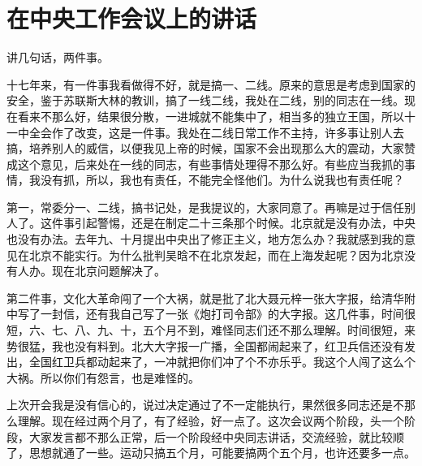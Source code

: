 \section[在中央工作会议上的讲话（一九六六年十月二十五日）]{在中央工作会议上的讲话}


讲几句话，两件事。

十七年来，有一件事我看做得不好，就是搞一、二线。原来的意思是考虑到国家的安全，鉴于苏联斯大林的教训，搞了一线二线，我处在二线，别的同志在一线。现在看来不那么好，结果很分散，一进城就不能集中了，相当多的独立王国，所以十一中全会作了改变，这是一件事。我处在二线日常工作不主持，许多事让别人去搞，培养别人的威信，以便我见上帝的时候，国家不会出现那么大的震动，大家赞成这个意见，后来处在一线的同志，有些事情处理得不那么好。有些应当我抓的事情，我没有抓，所以，我也有责任，不能完全怪他们。为什么说我也有责任呢？

第一，常委分一、二线，搞书记处，是我提议的，大家同意了。再嘛是过于信任别人了。这件事引起警惕，还是在制定二十三条那个时候。北京就是没有办法，中央也没有办法。去年九、十月提出中央出了修正主义，地方怎么办？我就感到我的意见在北京不能实行。为什么批判吴晗不在北京发起，而在上海发起呢？因为北京没有人办。现在北京问题解决了。

第二件事，文化大革命闯了一个大祸，就是批了北大聂元梓一张大字报，给清华附中写了一封信，还有我自己写了一张《炮打司令部》的大字报。这几件事，时间很短，六、七、八、九、十，五个月不到，难怪同志们还不那么理解。时间很短，来势很猛，我也没有料到。北大大字报一广播，全国都闹起来了，红卫兵信还没有发出，全国红卫兵都动起来了，一冲就把你们冲了个不亦乐乎。我这个人闯了这么个大祸。所以你们有怨言，也是难怪的。

上次开会我是没有信心的，说过决定通过了不一定能执行，果然很多同志还是不那么理解。现在经过两个月了，有了经验，好一点了。这次会议两个阶段，头一个阶段，大家发言都不那么正常，后一个阶段经中央同志讲话，交流经验，就比较顺了，思想就通了一些。运动只搞五个月，可能要搞两个五个月，也许还要多一点。

